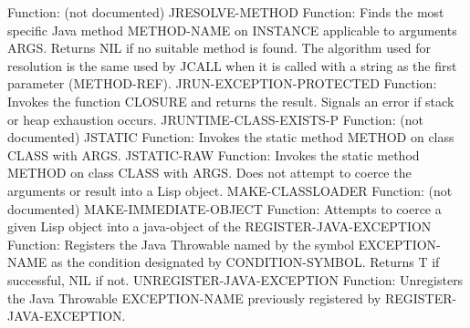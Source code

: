   Function: (not documented)
JRESOLVE-METHOD
  Function: Finds the most specific Java method METHOD-NAME on INSTANCE applicable to arguments ARGS. Returns NIL if no suitable method is found. The algorithm used for resolution is the same used by JCALL when it is called with a string as the first parameter (METHOD-REF).
JRUN-EXCEPTION-PROTECTED
  Function: Invokes the function CLOSURE and returns the result.  Signals an error if stack or heap exhaustion occurs.
JRUNTIME-CLASS-EXISTS-P
  Function: (not documented)
JSTATIC
  Function: Invokes the static method METHOD on class CLASS with ARGS.
JSTATIC-RAW
  Function: Invokes the static method METHOD on class CLASS with ARGS. Does not attempt to coerce the arguments or result into a Lisp object.
MAKE-CLASSLOADER
  Function: (not documented)
MAKE-IMMEDIATE-OBJECT
  Function: Attempts to coerce a given Lisp object into a java-object of the
REGISTER-JAVA-EXCEPTION
  Function: Registers the Java Throwable named by the symbol EXCEPTION-NAME as the condition designated by CONDITION-SYMBOL.  Returns T if successful, NIL if not.
UNREGISTER-JAVA-EXCEPTION
  Function: Unregisters the Java Throwable EXCEPTION-NAME previously registered by REGISTER-JAVA-EXCEPTION.
